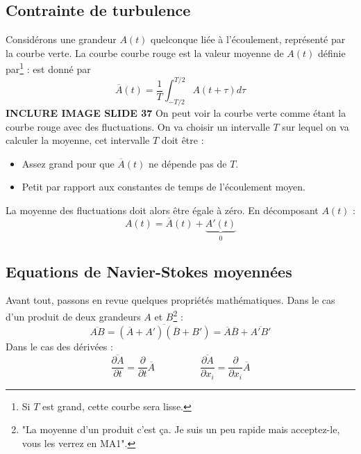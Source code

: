 \subsection{Contrainte de turbulence}
Considérons une grandeur $A(t)$ quelconque liée à l'écoulement, représenté par la courbe verte. 
La courbe courbe rouge est la valeur moyenne de $A(t)$ définie par\footnote{Si $T$ est grand, 
cette courbe sera lisse.} : 
est donné par 
\begin{equation}
	\overline{A}(t) = \frac{1}{T}\int_{-T/2}^{T/2} A(t+\tau)d\tau
\end{equation}
\textbf{INCLURE IMAGE SLIDE 37}
On peut voir la courbe verte comme étant la courbe rouge avec des fluctuations. On va choisir 
un intervalle $T$ sur lequel on va calculer la moyenne, cet intervalle $T$ doit être :
\begin{itemize}
	\item Assez grand pour que $\overline{A}(t)$ ne dépende pas de $T$.
	\item Petit par rapport aux constantes de temps de l'écoulement moyen.
\end{itemize}
La moyenne des fluctuations doit alors être égale à zéro. En décomposant $A(t)$ :
\begin{equation}
	A(t) = \overline{A}(t) + \underbrace{A'(t)}_{0}
\end{equation}
	
	
	
\subsection{Equations de Navier-Stokes moyennées}
Avant tout, passons en revue quelques propriétés mathématiques. Dans le cas d'un produit de deux 
grandeurs $A$ et $B$\footnote{"La moyenne d'un produit c'est ça. Je suis un peu rapide mais 
acceptez-le, vous les verrez en MA1".} :
\begin{equation}
	\overline{AB} = \overline{(\overline{A}+A')(\overline{B}+B')} = \overline{A}\overline{B} + 
	\overline{A'B'}
\end{equation}
Dans le cas des dérivées :
\begin{equation}
	\frac{\overline{\partial A}}{\partial t} = \frac{\partial}{\partial t}\overline{A}\ \ \ \ \ \ 
	\ \ \ \ \ \ \ \ \ \ \ \ \ \ \ \frac{\overline{\partial A}}{\partial x_i} = \frac{\partial}{
		\partial x_i}\overline{A}
\end{equation}
	
